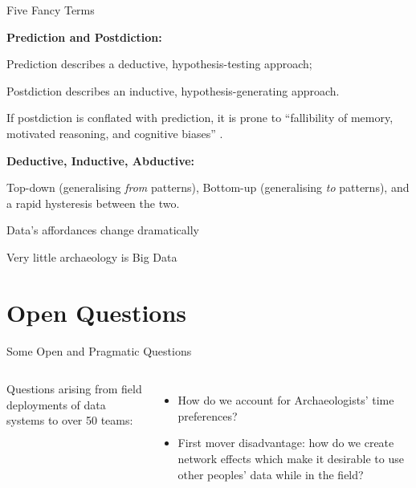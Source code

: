 \documentclass[aspectratio=1610, 11pt]{beamer} %
\begin{document}
\begin{frame}{Five Fancy Terms}

\textbf{Prediction and Postdiction:}

Prediction describes a deductive, hypothesis-testing approach;

Postdiction describes an inductive, hypothesis-generating approach.

If postdiction is conflated with prediction, it is prone to “fallibility of memory, motivated reasoning, and cognitive biases” \cite{Nosek2018-yv}.

\textbf{Deductive, Inductive, Abductive:}

Top-down (generalising \textit{from} patterns), Bottom-up (generalising \textit{to} patterns), and a rapid hysteresis between the two. 

Data's affordances change dramatically 


\end{frame}

\begin{frame}{Very little archaeology is Big Data}


\end{frame}


\section{Open Questions}


\begin{frame}{Some Open and Pragmatic Questions}
\begin{columns}

Questions arising from field deployments of data systems to over 50 teams:

\begin{itemize}[label=\textbullet]
    \item How do we account for Archaeologists' time preferences?
    \item First mover disadvantage: how do we create network effects which make it desirable to use other peoples' data while in the field?
\end{itemize}



\end{columns}
\end{frame}


\end{document}
